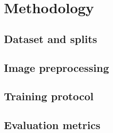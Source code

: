 \chapter{Methodology}
\label{ch:methodology}


\section{Dataset and splits}

\section{Image preprocessing}

\section{Training protocol}

\section{Evaluation metrics}

